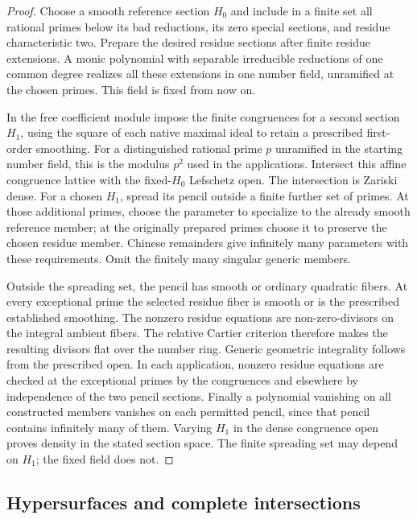 \documentclass[11pt,a4paper]{article}
\theoremstyle{definition}
\theoremstyle{remark}\newtheorem{remark}[theorem]{Remark}
\numberwithin{equation}{section}
\begin{document}
\begin{proof}
Choose a smooth reference section $H_0$ and include in a finite
set all rational primes below its bad reductions, its zero special
sections, and residue characteristic two. Prepare the desired
residue sections after finite residue extensions. A monic
polynomial with separable irreducible reductions of one common
degree realizes all these extensions in one number field, unramified
at the chosen primes. This field is fixed from now on.

In the free coefficient module impose the finite congruences for a
second section $H_1$, using the square of each native maximal
ideal to retain a prescribed first-order smoothing. For a
distinguished rational prime $p$ unramified in the starting
number field, this is the modulus $p^2$ used in the applications.
Intersect this
affine congruence lattice with the fixed-$H_0$ Lefschetz open. The
intersection is Zariski dense. For a chosen $H_1$, spread its pencil
outside a finite further set of primes. At those additional primes,
choose the parameter to specialize to the already smooth reference
member; at the originally prepared primes choose it to preserve
the chosen residue member. Chinese remainders give infinitely many
parameters with these requirements. Omit the finitely many singular
generic members.

Outside the spreading set, the pencil has smooth or ordinary
quadratic fibers. At every exceptional prime the selected residue
fiber is smooth or is the prescribed established smoothing.
The nonzero residue equations are non-zero-divisors on the integral
ambient fibers. The relative Cartier criterion therefore makes the
resulting divisors flat over the number ring. Generic geometric
integrality follows from the prescribed open. In each application,
nonzero residue equations are checked at the exceptional primes by
the congruences and elsewhere by independence of the two pencil
sections. Finally a polynomial
vanishing on all constructed members vanishes on each permitted
pencil, since that pencil contains infinitely many of them. Varying
$H_1$ in the dense congruence open proves density in the stated
section space. The finite spreading set may depend on $H_1$; the
fixed field does not.
\end{proof}

\subsection{Hypersurfaces and complete intersections}
\end{document}
